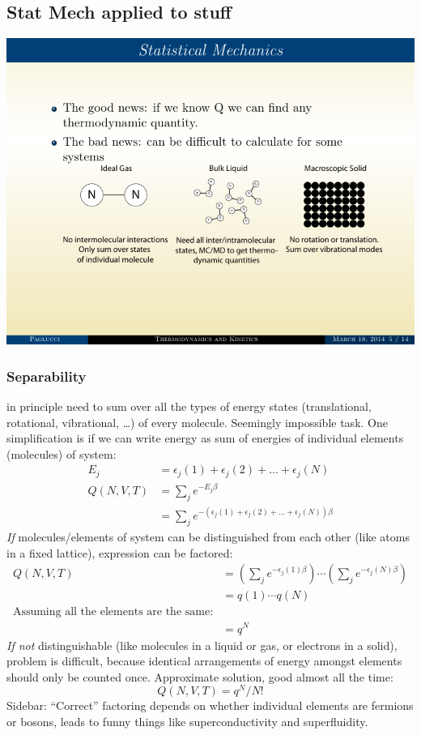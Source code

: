 \documentclass[11pt]{article}
\begin{document}
\subsection{Stat Mech applied to stuff}
\label{sec:orge4b840d}
\begin{center}
\includegraphics[width=.9\linewidth]{./Images/gls.pdf}
\end{center}

\subsubsection{Separability}
\label{sec:org3e59238}

in principle need to sum over all the types of energy states (translational,
rotational, vibrational, \ldots{}) of every molecule.  Seemingly impossible task.
One simplification is if we can write energy as sum of energies of individual
elements (molecules) of system:
\begin{align}
  E_j&=\epsilon_j(1)+\epsilon_j(2) + ... + \epsilon_j(N) \\
  Q(N,V,T) &= \sum_j e^{-E_j\beta} \\
  &=\sum_je^{-(\epsilon_j(1)+\epsilon_j(2) + ... + \epsilon_j(N))\beta}
\end{align}
\emph{If} molecules/elements of system can be distinguished from each
        other (like atoms in a fixed lattice), expression can be factored:
  \begin{align}
    Q(N,V,T)&=\left ( \sum_j e^{-\epsilon_j(1)\beta}\right )\cdots \left ( \sum_j
      e^{-\epsilon_j(N)\beta}\right ) \\
  &= q(1)\cdots q(N) \\
  \text{Assuming all the elements are the same:}\\
  &= q^N
\end{align}
\emph{If not} distinguishable (like molecules in a liquid or gas, or
      electrons in a solid), problem is difficult, because identical
      arrangements of energy amongst elements should only be counted once.
      Approximate solution, good almost all the time:
\begin{equation}
  Q(N,V,T)=q^N/N!
\end{equation}
Sidebar: ``Correct'' factoring depends on whether individual elements
     are fermions or bosons, leads to funny things like superconductivity and
     superfluidity.
\end{document}
